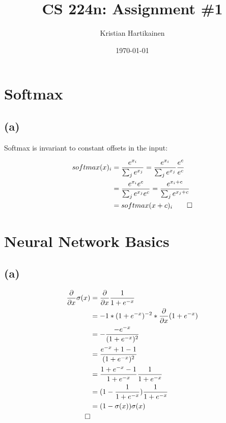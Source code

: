 \documentclass{article}
\begin{document}
\title{ CS 224n: Assignment \#1 }
\author{Kristian Hartikainen}
\date{\today}
\pagestyle{myheadings}

\maketitle

\section{Softmax}
\subsection*{(a)}
Softmax is invariant to constant offsets in the input:

\begin{equation*}
  \label{eq:softmax-constant-invariant}
  \begin{split}
    softmax(x)_{i} &= \frac{ e^{ x_{i} }       }{ \sum_{j}{ e^{ x_{j} }} }
                    = \frac{ e^{ x_{i} }       }{ \sum_{j}{ e^{ x_{j} }}} \frac{e^{c}}{{e^{c}}} \\
                 &= \frac{ e^{ x_{i} } e^{c} }{ \sum_{j}{ e^{ x_{j} } e^{c}}}
                  = \frac{ e^{ x_{i} + c }   }{ \sum_{j}{ e^{ x_{j} + c } } } \\
                 &= softmax(x + c)_{i}
  \qedhere
  \end{split}
\end{equation*}

\section{Neural Network Basics}
\subsection*{(a)}
\begin{equation*}
  \label{eq:sigmoid-gradient}
  \begin{split}
    \frac{ \partial }{ \partial x } \sigma(x)
      &= \frac{ \partial }{ \partial x } \frac{ 1 }{ 1 + e^{-x} } \\
      &= -1*(1 + e^{-x})^{-2} * \frac{ \partial }{ \partial x } (1+e^{-x}) \\
      &= -\frac{ -e^{-x} }{ (1 + e^{-x})^{2} } \\
      &=  \frac{ e^{-x} + 1 - 1 }{ (1 + e^{-x})^{2} } \\
      &=  \frac{ 1 + e^{-x} - 1 }{ 1 + e^{-x} } \frac{ 1 }{ 1 + e^{-x} } \\
      &=  (1 - \frac{ 1 }{ 1 + e^{-x} }) \frac{ 1 }{ 1 + e^{-x} } \\
      &=  (1 - \sigma(x)) \sigma(x) \\
  \qedhere
  \end{split}
\end{equation*}
\end{document}
